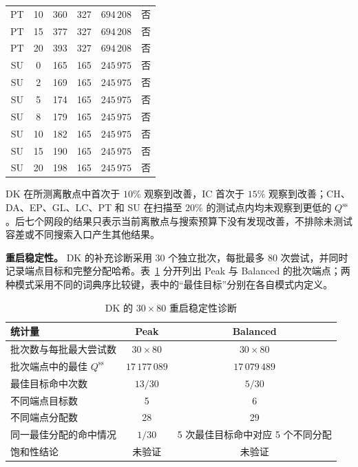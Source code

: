 \documentclass[UTF8,a4paper,twoside,zihao=-4]{ctexart}
\numberwithin{equation}{section}
\numberwithin{figure}{section}
\numberwithin{table}{section}
\theoremstyle{definition}
\numberwithin{algocf}{section}
\begin{document}
{\begin{longtable}{@{}ccrrrc@{}}
PT & 10 & 360 & 327 & $694\,208$    & 否 \\
PT & 15 & 377 & 327 & $694\,208$    & 否 \\
PT & 20 & 393 & 327 & $694\,208$    & 否 \\
\addlinespace
SU & 0  & 165 & 165 & $245\,975$    & 否 \\
SU & 2  & 169 & 165 & $245\,975$    & 否 \\
SU & 5  & 174 & 165 & $245\,975$    & 否 \\
SU & 8  & 179 & 165 & $245\,975$    & 否 \\
SU & 10 & 182 & 165 & $245\,975$    & 否 \\
SU & 15 & 190 & 165 & $245\,975$    & 否 \\
SU & 20 & 198 & 165 & $245\,975$    & 否 \\
\end{longtable}
}

DK 在所测离散点中首次于 $10\%$ 观察到改善，IC 首次于 $15\%$ 观察到改善；CH、DA、EP、GL、LC、PT 和 SU 在扫描至 $20\%$ 的测试点内均未观察到更低的 $Q^{\mathrm{ss}}$。后七个网段的结果只表示当前离散点与搜索预算下没有发现改善，不排除未测试容差或不同搜索入口产生其他结果。

\noindent\textbf{重启稳定性。}
DK 的补充诊断采用 30 个独立批次，每批最多 80 次尝试，并同时记录端点目标和完整分配哈希。表~\ref{tab:appendix-restart} 分开列出 Peak 与 Balanced 的批次端点；两种模式采用不同的词典序比较键，表中的“最佳目标”分别在各自模式内定义。

\begin{table}[htbp]
\centering
\small
\caption{DK 的 $30\times80$ 重启稳定性诊断}
\label{tab:appendix-restart}
\begin{tabularx}{\textwidth}{@{}Xcc@{}}
\toprule
统计量 & Peak & Balanced \\
\midrule
批次数与每批最大尝试数 & $30\times80$ & $30\times80$ \\
批次端点中的最佳 $Q^{\mathrm{ss}}$ & $17\,177\,089$ & $17\,079\,489$ \\
最佳目标命中次数 & $13/30$ & $5/30$ \\
不同端点目标数 & 5 & 6 \\
不同端点分配数 & 28 & 29 \\
同一最佳分配的命中情况 & $1/30$ & 5 次最佳目标命中对应 5 个不同分配 \\
饱和性结论 & 未验证 & 未验证 \\
\bottomrule
\end{tabularx}
\end{table}
\end{document}
